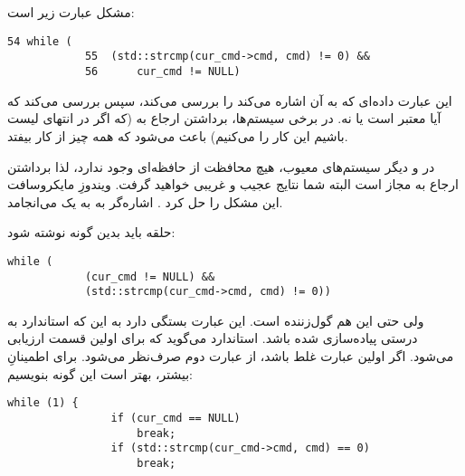 \section{}
\paragraph{}\label{answer:70}
مشکل عبارت زیر است:
\begin{LTR}
        \begin{lstlisting}[style=C++Style]
            54 while (
            55 	(std::strcmp(cur_cmd->cmd, cmd) != 0) &&
            56		cur_cmd != NULL)
        \end{lstlisting}
\end{LTR}

این عبارت داده‌ای که  به آن اشاره می‌کند را بررسی می‌کند، سپس بررسی می‌کند که آیا  معتبر است یا نه. در برخی سیستم‌ها، برداشتن ارجاع به  (که اگر در انتهای لیست باشیم این کار را می‌کنیم) باعث می‌شود که همه چیز از کار بیفتد.

در  و دیگر سیستم‌های معیوب، هیچ محافظت از حافظه‌ای وجود ندارد، لذا برداشتن ارجاع به  مجاز است البته شما نتایج عجیب و غریبی خواهید گرفت. ویندوزِ مایکروسافت این مشکل را حل کرد . اشاره‌گر به  به یک  می‌انجامد.

حلقه باید بدین گونه نوشته شود:
\begin{LTR}
        \begin{lstlisting}[style=C++Style]
            while (
            (cur_cmd != NULL) &&
            (std::strcmp(cur_cmd->cmd, cmd) != 0))
        \end{lstlisting}
\end{LTR}

 ولی حتی این هم گول‌زننده است. این عبارت بستگی دارد به این که استاندارد  به درستی پیاده‌سازی شده باشد. استاندارد  می‌گوید که برای \lr{\texttt{\&\&}} اولین قسمت ارزیابی می‌شود. اگر اولین عبارت غلط باشد، از عبارت دوم صرف‌نظر می‌شود. برای اطمینانِ بیشتر، بهتر است این گونه بنویسیم:
\begin{LTR}
        \begin{lstlisting}[style=C++Style]
            while (1) {
                if (cur_cmd == NULL)
                    break;
                if (std::strcmp(cur_cmd->cmd, cmd) == 0)
                    break;
        \end{lstlisting}
\end{LTR}
